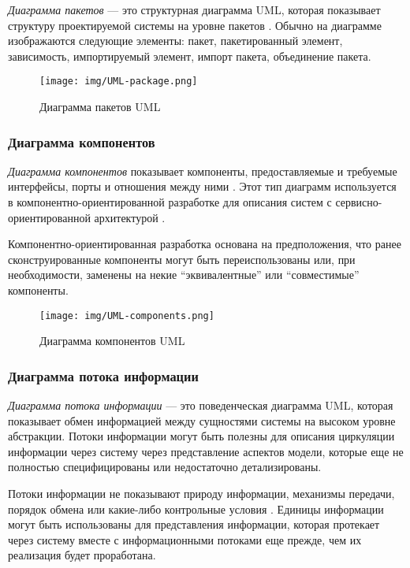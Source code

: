 \documentclass[14pt,russian]{extarticle}
\newcommand*\term[1]{\textit{#1}}
\begin{document}
\term{Диаграмма пакетов} --- это структурная диаграмма UML, которая показывает
структуру проектируемой системы на уровне пакетов \cite{martin}. Обычно на диаграмме
изображаются следующие элементы: пакет, пакетированный элемент, зависимость,
импортируемый элемент, импорт пакета, объединение пакета.

\begin{figure}[H]
	\centering
	\texttt{[image: img/UML-package.png]}
	\caption{Диаграмма пакетов UML}
\end{figure}

\subsubsection{Диаграмма компонентов}

\term{Диаграмма компонентов} показывает компоненты, предоставляемые и требуемые
интерфейсы, порты и отношения между ними \cite{buch}. Этот тип диаграмм используется в
компонентно-ориентированной разработке для описания систем с
сервисно-ориентированной архитектурой \cite{douglass}.

Компонентно-ориентированная разработка основана на предположения, что ранее
сконструированные компоненты могут быть переиспользованы или, при необходимости,
заменены на некие ``эквивалентные'' или ``совместимые'' компоненты.

\begin{figure}[H]
	\centering
	\texttt{[image: img/UML-components.png]}
	\caption{Диаграмма компонентов UML}
\end{figure}

\subsubsection{Диаграмма потока информации}

\term{Диаграмма потока информации} --- это поведенческая диаграмма UML, которая
показывает обмен информацией между сущностями системы на высоком уровне
абстракции. Потоки информации могут быть полезны для описания циркуляции
информации через систему через представление аспектов модели, которые еще не
полностью специфицированы или недостаточно детализированы.

Потоки информации не показывают природу информации, механизмы передачи, порядок
обмена или какие-либо контрольные условия \cite{penker}. Единицы информации могут быть
использованы для представления информации, которая протекает через систему
вместе с информационными потоками еще прежде, чем их реализация будет
проработана.
\end{document}

